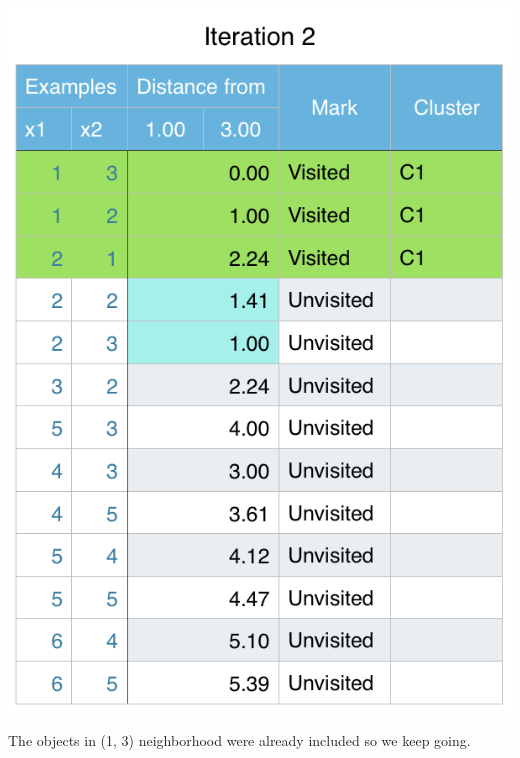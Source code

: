 \documentclass[11pt]{article}
\begin{document}
\begin{center}
\includegraphics[scale=0.60]{dbscan-iter2.png}
\end{center}

The objects in (1, 3) neighborhood were already included so we keep going.
\end{document}
